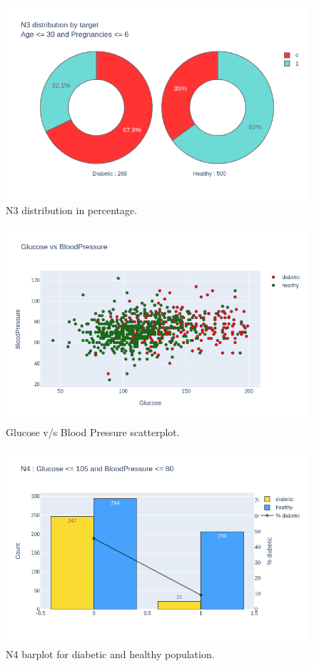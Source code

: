 \documentclass[12pt]{article}
\begin{document}
\begin{figure}[ht]
\centering
\includegraphics[width=1\textwidth]{newplot(19).png}
\caption{\label{fig:29} N3 distribution in percentage.}
\end{figure}

\begin{figure}[ht]
\centering
\includegraphics[width=1\textwidth]{newplot(20).png}
\caption{\label{fig:30} Glucose v/s Blood Pressure scatterplot.}
\end{figure}

\begin{figure}[ht]
\centering
\includegraphics[width=1\textwidth]{newplot(21).png}
\caption{\label{fig:31} N4 barplot for diabetic and healthy population.}
\end{figure}
\end{document}
